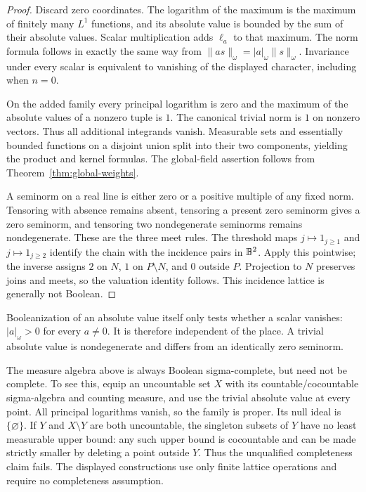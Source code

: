 \begin{proof}
Discard zero coordinates. The logarithm of the maximum is the maximum of
finitely many $L^1$ functions, and its absolute value is bounded by the sum
of their absolute values. Scalar multiplication adds $\ell_a$ to that
maximum. The norm formula follows in exactly the same way from
$\|as\|_\omega=|a|_\omega\|s\|_\omega$. Invariance under every scalar
is equivalent to vanishing of the displayed character, including when
$n=0$.

On the added family every principal logarithm is zero and the maximum
of the absolute values of a nonzero tuple is $1$. The canonical trivial
norm is $1$ on nonzero vectors. Thus all additional integrands vanish.
Measurable sets and essentially bounded functions on a disjoint union
split into their two components, yielding the product and kernel formulas.
The global-field assertion follows from Theorem~\ref{thm:global-weights}.

A seminorm on a real line is either zero or a positive multiple of any
fixed norm. Tensoring with absence remains absent, tensoring a present
zero seminorm gives a zero seminorm, and tensoring two nondegenerate
seminorms remains nondegenerate. These are the three meet rules. The
threshold maps $j\mapsto1_{j\ge1}$ and $j\mapsto1_{j\ge2}$ identify the
chain with the incidence pairs in $\mathbb B^2$. Apply this pointwise; the inverse
assigns $2$ on $N$, $1$ on $P\setminus N$, and $0$ outside $P$. Projection to $N$
preserves joins and meets, so the valuation identity follows. This
incidence lattice is generally not Boolean.
\end{proof}

Booleanization of an absolute value itself only tests whether a scalar
vanishes: $|a|_\omega>0$ for every $a\ne0$. It is therefore independent of
the place. A trivial absolute value is nondegenerate and differs from an
identically zero seminorm.

The measure algebra above is always Boolean sigma-complete, but need not
be complete. To see this, equip an uncountable set $X$ with its
countable/cocountable sigma-algebra and counting measure, and use the
trivial absolute value at every point. All principal logarithms vanish,
so the family is proper. Its null ideal is $\{\varnothing\}$. If $Y$ and
$X\setminus Y$ are both uncountable, the singleton subsets of $Y$ have no
least measurable upper bound: any such upper bound is cocountable and
can be made strictly smaller by deleting a point outside $Y$. Thus the
unqualified completeness claim fails. The displayed constructions use
only finite lattice operations and require no completeness assumption.

